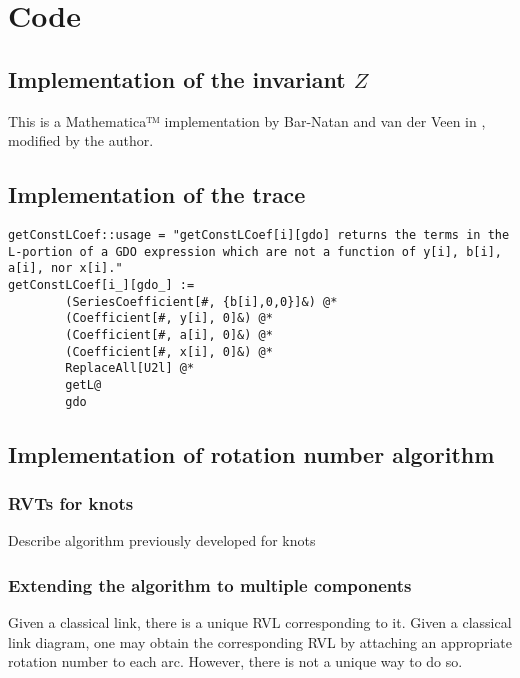 \chapter{Code}
\section{Implementation of the invariant $Z$}
This is a Mathematica™ implementation by Bar-Natan and van der Veen in
\cite{BV}, modified by the author.

\section{Implementation of the trace}


\begin{verbatim}
getConstLCoef::usage = "getConstLCoef[i][gdo] returns the terms in the L-portion of a GDO expression which are not a function of y[i], b[i], a[i], nor x[i]."
getConstLCoef[i_][gdo_] :=
        (SeriesCoefficient[#, {b[i],0,0}]&) @*
        (Coefficient[#, y[i], 0]&) @*
        (Coefficient[#, a[i], 0]&) @*
        (Coefficient[#, x[i], 0]&) @*
        ReplaceAll[U2l] @*
        getL@
        gdo
\end{verbatim}

\section{Implementation of rotation number algorithm}


\subsection{\acp{RVT} for knots}
Describe algorithm previously developed for knots

\subsection{Extending the algorithm to multiple components}

Given a classical link, there is a unique \ac{RVL} corresponding to it. Given a
classical link diagram, one may obtain the corresponding \ac{RVL} by attaching
an appropriate rotation number to each arc. However, there is not a unique way
to do so.


